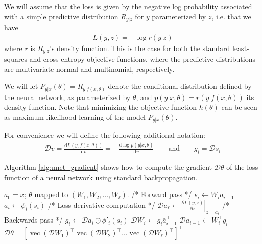 \documentclass[12pt]{article}
\newcommand{\nonlin}{\phi}
\newcommand{\ovec}{\operatorname{vec}}
\newcommand{\deriv}{\mathcal{D}}
\newcommand{\derivfrac}[2]{\frac{\mathrm{d}#1}{\mathrm{d}#2}}
\begin{document}
We will assume that the loss is given by the negative log probability associated with a simple predictive distribution $R_{y|z}$ for $y$ parameterized by $z$, i.e. that we have
\begin{align*}
L(y,z) = -\log r( y | z )
\end{align*}
where $r$ is $R_{y|z}$'s density function.  This is the case for both the standard least-squares and cross-entropy objective functions, where the predictive distributions are multivariate normal and multinomial, respectively.

We will let $P_{y|x}(\theta) = R_{y|f(x,\theta)}$ denote the conditional distribution defined by the neural network, as parameterized by $\theta$, and $p(y|x,\theta) = r(y|f(x,\theta))$ its density function.  Note that minimizing the objective function $h(\theta)$ can be seen as maximum likelihood learning of the model $P_{y|x}(\theta)$.

For convenience we will define the following additional notation:
\begin{align*}
\deriv v = \derivfrac{L( y, f(x,\theta) ) }{v} = -\derivfrac{ \log p(y|x,\theta) }{v} \quad \quad \mbox{and} \quad \quad g_i = \deriv s_i
\end{align*}

Algorithm \ref{alg:nnet_gradient} shows how to compute the gradient $\deriv \theta$ of the loss function of a neural network using standard backpropagation. 



\begin{algorithm}
\begin{algorithmic}
 $a_0 = x$; $\theta$ mapped to $(W_1,W_2,\ldots,W_\ell)$.
\STATE
\STATE /* Forward pass */
\STATE $s_i \gets W_i \bar{a}_{i-1}$\\
\STATE $a_i \gets \nonlin_i(s_i)$
\ENDFOR
\STATE
\STATE /* Loss derivative computation */
\STATE $\displaystyle \deriv a_\ell \gets \left. \frac{\partial L(y, z)}{\partial z} \right |_{z = a_\ell}$
\STATE
\STATE
\STATE /* Backwards pass */
\STATE $g_i \gets \deriv a_i \odot \nonlin'_i(s_i)$
\STATE $\deriv W_i \gets g_i \bar{a}_{i-1}^\top$
\STATE $\deriv a_{i-1} \gets W_i^\top g_i$
\ENDFOR
\STATE
 $\deriv \theta = [ \ovec(\deriv W_1)^\top \ovec(\deriv W_2)^\top \dots \ovec(\deriv W_\ell)^\top ]^\top$
\end{algorithmic}
\caption{An algorithm for computing the gradient of the loss $L(y,f(x,\theta))$ for a given $(x,y)$. Note that we are assuming here for simplicity that the $\nonlin_i$ are defined as coordinate-wise functions. \label{alg:nnet_gradient}}
\end{algorithm}
\end{document}
